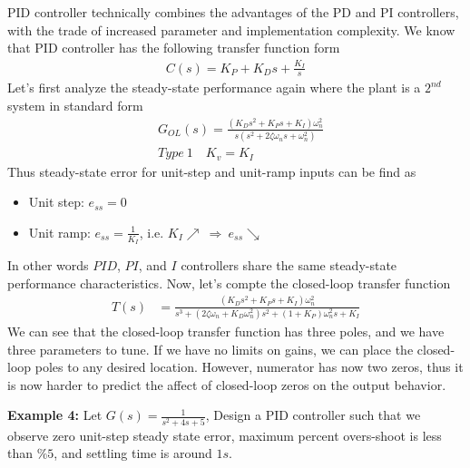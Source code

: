 \documentclass[twoside]{article}
\begin{document}
PID controller technically combines the advantages of 
the PD and PI controllers, with the trade of increased
parameter and implementation complexity. 
We know that PID controller has the following 
transfer function form
%
\begin{align*}
 C(s) = K_P + K_D s + \frac{K_I}{s}
\end{align*}
%
Let's first analyze the steady-state 
performance again where the plant is a $2^{nd}$ system in standard form
%
\begin{align*}
  &G_{OL}(s) = \frac{( K_D s^2 +  K_P s +  K_I ) \omega_n^2}{s (s^2 + 2 \zeta
    \omega_n s + \omega_n^2)}
\\
 &Type \ 1 \quad K_v = K_I
\end{align*}
% 
Thus steady-state error for unit-step and unit-ramp inputs can be find
as
\begin{itemize}
\item Unit step: $e_{ss} = 0$ 
\item Unit ramp: $e_{ss} = \frac{1}{K_I}$, i.e. $K_I \nearrow \ \Rightarrow \ e_{ss} \searrow$  
\end{itemize}
In other words $PID$, $PI$, and $I$ controllers share the same steady-state
performance characteristics. Now, let's compte the closed-loop transfer function
%
\begin{align*}
  T(s) &= \frac{( K_D s^2 +  K_P s +  K_I ) \omega_n^2}{ s^3 + (2 \zeta
         \omega_n + K_D \omega_n^2) s^2 + (1 + K_P) \omega_n^2 s +  K_I}
\end{align*}
%
We can see that the closed-loop transfer function has three poles, and
we have three parameters to tune. If we have no limits on gains, we
can place the closed-loop poles to any desired location. However,
numerator has now two zeros, thus it is now harder to predict the
affect of closed-loop zeros on the output behavior. 

\textbf{Example 4:} Let $G(s) = \frac{1}{s^2 + 4 s + 5}$, Design a
PID controller such that we observe zero unit-step steady state error, 
maximum percent overs-shoot is less than $\% 5$, and settling time 
is around $1 s$. 
\end{document}
